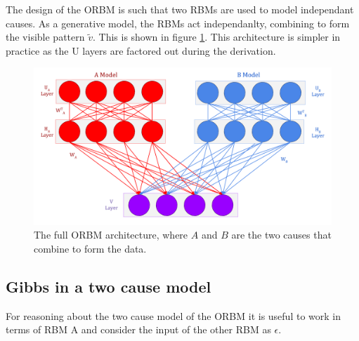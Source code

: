 The design of the ORBM is such that two RBMs are used to model independant causes. As a generative model, the RBMs act independanlty, combining to form the visible pattern $\tilde{v}$. This is shown in figure \ref{F:ORBM-Architecture}. This architecture is simpler in practice as the U layers are factored out during the derivation.

\begin{figure}[h]
\begin{center}
  \includegraphics[width = 7in]{Assets/ORBM-Full-Architecture.png}
\caption{The full ORBM architecture, where $A$ and $B$ are the two causes that combine to form the data.}
\label{F:ORBM-Architecture}
\end{center}
\end{figure}

\subsection{Gibbs in a two cause model}

For reasoning about the two cause model of the ORBM it is useful to work in terms of RBM A and consider the input of the other RBM as $ \epsilon$.



